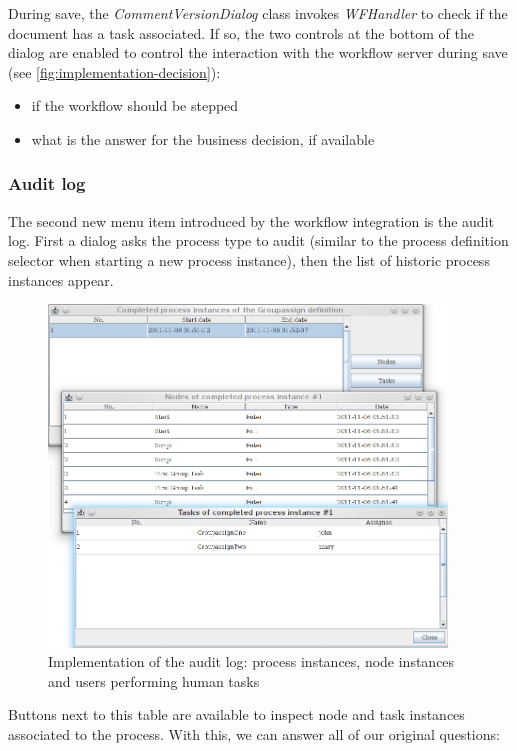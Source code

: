 During save, the \emph{CommentVersionDialog} class invokes \emph{WFHandler} to
check if the document has a task associated. If so, the two controls at the
bottom of the dialog are enabled to control the interaction with the workflow
server during save (see \autoref{fig:implementation-decision}):

\begin{itemize}
\item if the workflow should be stepped
\item what is the answer for the business decision, if available
\end{itemize}

\subsubsection*{Audit log}

The second new menu item introduced by the workflow integration is the audit
log. First a dialog asks the process type to audit (similar to the process
definition selector when starting a new process instance), then the list of
historic process instances appear.

\begin{figure}[H]
\centering
\includegraphics[width=400px,keepaspectratio]{implementation-auditlog.png}
\caption{Implementation of the audit log: process instances, node instances and users performing human tasks}
\label{fig:implementation-auditlog}
\end{figure}

Buttons next to this table are available to inspect node and task instances
associated to the process. With this, we can answer all of our original
questions:

